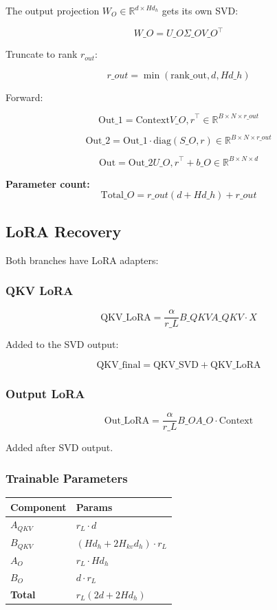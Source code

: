The output projection $W_O \in \mathbb{R}^{d \times H d_h}$ gets its own SVD:

\[
W\_O = U\_O \Sigma\_O V\_O^\top
\]

Truncate to rank $r_{out}$:

\[
r\_{out} = \min(\text{rank\_out}, d, H d\_h)
\]

Forward:

\[
\text{Out}\_1 = \text{Context} V\_{O, r}^\top \in \mathbb{R}^{B \times N \times r\_{out}}
\]

\[
\text{Out}\_2 = \text{Out}\_1 \cdot \text{diag}(S\_{O, r}) \in \mathbb{R}^{B \times N \times r\_{out}}
\]

\[
\text{Out} = \text{Out}\_2 U\_{O, r}^\top + b\_O \in \mathbb{R}^{B \times N \times d}
\]

\textbf{Parameter count:}
\[
\text{Total}\_O = r\_{out} (d + H d\_h) + r\_{out}
\]

\subsection{LoRA Recovery}

Both branches have LoRA adapters:

\subsubsection{QKV LoRA}

\[
\text{QKV}\_\text{LoRA} = \frac{\alpha}{r\_L} B\_{QKV} A\_{QKV} \cdot X
\]

Added to the SVD output:

\[
\text{QKV}\_\text{final} = \text{QKV}\_\text{SVD} + \text{QKV}\_\text{LoRA}
\]

\subsubsection{Output LoRA}

\[
\text{Out}\_\text{LoRA} = \frac{\alpha}{r\_L} B\_O A\_O \cdot \text{Context}
\]

Added after SVD output.

\subsubsection{Trainable Parameters}

\begin{table}[H]
\centering
\small
\begin{tabular}{ll}
\toprule
\textbf{Component} & \textbf{Params} \\
\midrule
$A_{QKV}$ & $r_L \cdot d$ \\
$B_{QKV}$ & $(H d_h + 2 H_{kv} d_h) \cdot r_L$ \\
$A_O$ & $r_L \cdot H d_h$ \\
$B_O$ & $d \cdot r_L$ \\
\textbf{Total} & $r_L (2d + 2 H d_h)$ \\
\bottomrule
\end{tabular}
\end{table}

